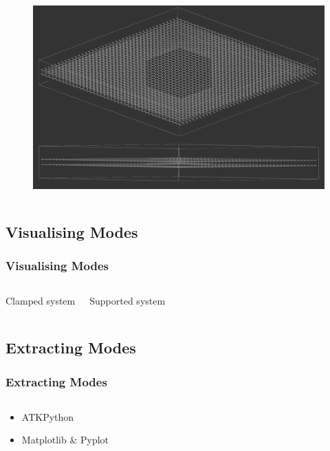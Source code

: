 \documentclass[hyperref={colorlinks=true,urlcolor=blue,linkcolor=.},aspectratio=1610,mathserif]{beamer}
\begin{document}
\begin{frame}
\begin{columns}[T]
\begin{figure}
   \vspace{1em}
   \centering
   \includegraphics[width=\columnwidth]{Figures/DoubleMembrane.png}
  \end{figure}
 \end{columns}
\end{frame}

\subsection{Visualising Modes}

\begin{frame}
 \frametitle{Visualising Modes}
 \begin{columns}[T]
  \begin{center}
   Clamped system
  \end{center}
  \begin{center}
   Supported system
  \end{center}
 \end{columns}
\end{frame}

\subsection{Extracting Modes}

\begin{frame}
 \frametitle{Extracting Modes}
 \begin{listing}[H]
  \inputminted[python3=true,bgcolor=Black,linenos=true,firstline=66,lastline=71,breaklines=true,breakautoindent=true]{python}{VNL/PythonScripts/Scripts/2DdataExtract.py}
 \end{listing}
 \begin{itemize}[<+->]
  \pause
  \item ATKPython
  \item Matplotlib \& Pyplot
 \end{itemize}
\end{frame}
\end{document}
